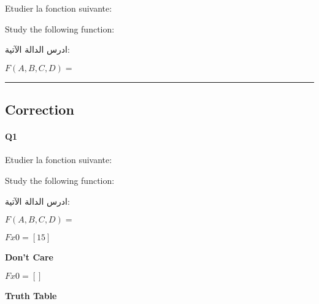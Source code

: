 Etudier la fonction suivante:



Study the following function:

\begin{arab}[utf]
ادرس الدالة الآتية:
\end{arab}
$F(A,B,C,D) =$



 




\hrule width 1\linewidth
\pagebreak

\subsection{Correction}


\paragraph{Q1}



Etudier la fonction suivante:



Study the following function:

\begin{arab}[utf]
ادرس الدالة الآتية:
\end{arab}
$F(A,B,C,D) =$





$Fx0 = [15]$

\textbf{Don't Care }

$Fx0 = []$



\textbf{Truth Table }



